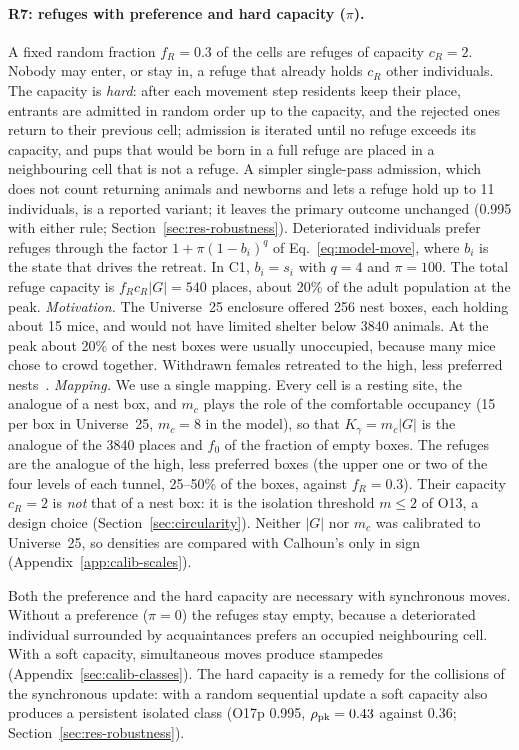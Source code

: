 \paragraph{R7: refuges with preference and hard capacity ($\pi$).}
A fixed random fraction $f_R=0.3$ of the cells are refuges of capacity $c_R=2$. Nobody may enter, or
stay in, a refuge that already holds $c_R$ other individuals. The capacity is \emph{hard}: after each
movement step residents keep their place, entrants are admitted in random order up to the capacity, and the
rejected ones return to their previous cell; admission is iterated until no refuge exceeds its capacity, and pups
that would be born in a full refuge are placed in a neighbouring cell that is not a refuge. A simpler
single-pass admission, which does not count returning animals and newborns and lets a refuge hold up to 11
individuals, is a reported variant; it leaves the primary outcome unchanged (0.995 with either rule;
Section~\ref{sec:res-robustness}).
Deteriorated individuals prefer refuges through the factor $1+\pi(1-b_i)^{q}$ of
Eq.~\eqref{eq:model-move}, where $b_i$ is the state that drives the retreat. In \textsf{C1}, $b_i=s_i$ with
$q=4$ and $\pi=100$. The total refuge capacity is $f_Rc_R|G|=540$ places, about 20\% of the
adult population at the peak.
\emph{Motivation.} The Universe~25 enclosure offered 256 nest boxes, each holding about 15 mice, and
would not have limited shelter below 3840 animals. At the peak about 20\% of the nest boxes were
usually unoccupied, because many mice chose to crowd together. Withdrawn females retreated to the high,
less preferred nests~\cite{Calhoun1973}.
\emph{Mapping.} We use a single mapping. Every cell is a resting site, the analogue of a nest box, and $m_c$
plays the role of the comfortable occupancy (15 per box in Universe~25, $m_c=8$ in the model), so that
$K_\gamma=m_c|G|$ is the analogue of the 3840 places and $f_0$ of the fraction of empty boxes. The refuges are the
analogue of the high, less preferred boxes (the upper one or two of the four levels of each tunnel, 25--50\% of the
boxes, against $f_R=0.3$). Their capacity $c_R=2$ is \emph{not} that of a nest box: it is the isolation threshold
$m\le2$ of O13, a design choice (Section~\ref{sec:circularity}). Neither $|G|$ nor $m_c$ was calibrated to
Universe~25, so densities are compared with Calhoun's only in sign (Appendix~\ref{app:calib-scales}).

Both the preference and the hard capacity are necessary with synchronous moves. Without a preference ($\pi=0$) the
refuges stay empty, because a deteriorated individual surrounded by acquaintances prefers an occupied neighbouring
cell. With a soft capacity, simultaneous moves produce stampedes (Appendix~\ref{sec:calib-classes}). The hard
capacity is a remedy for the collisions of the synchronous update: with a random sequential update a soft capacity
also produces a persistent isolated class (O17p 0.995, $\rho_{\rm pk}=0.43$ against 0.36;
Section~\ref{sec:res-robustness}).

